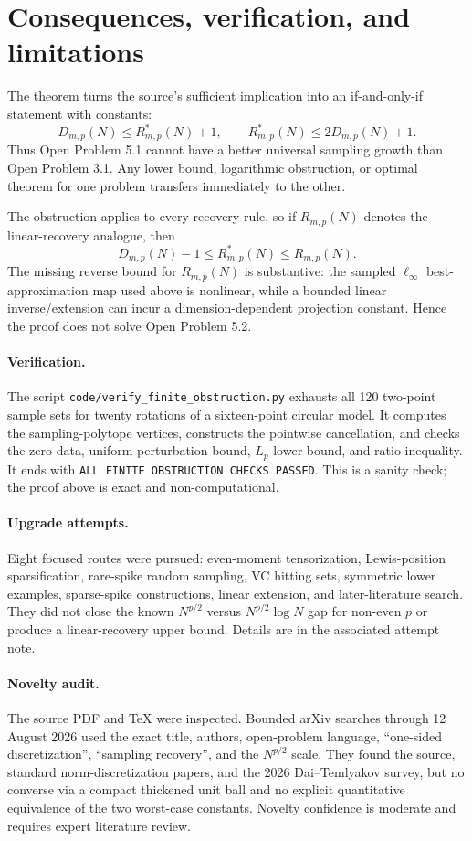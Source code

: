 \documentclass[11pt]{article}
\begin{document}
\section{Consequences, verification, and limitations}

The theorem turns the source's sufficient implication into an if-and-only-if
statement with constants:
\[
 D_{m,p}(N)\le R^*_{m,p}(N)+1,
 \qquad R^*_{m,p}(N)\le2D_{m,p}(N)+1.
\]
Thus Open Problem 5.1 cannot have a better universal sampling growth than Open
Problem 3.1.  Any lower bound, logarithmic obstruction, or optimal theorem for
one problem transfers immediately to the other.

The obstruction applies to every recovery rule, so if $R_{m,p}(N)$ denotes
the linear-recovery analogue, then
\[
 D_{m,p}(N)-1\le R^*_{m,p}(N)\le R_{m,p}(N).
\]
The missing reverse bound for $R_{m,p}(N)$ is substantive: the sampled
$\ell_\infty$ best-approximation map used above is nonlinear, while a bounded
linear inverse/extension can incur a dimension-dependent projection constant.
Hence the proof does not solve Open Problem 5.2.

\paragraph{Verification.}
The script \texttt{code/verify\_finite\_obstruction.py} exhausts all 120
two-point sample sets for twenty rotations of a sixteen-point circular model.
It computes the sampling-polytope vertices, constructs the pointwise
cancellation, and checks the zero data, uniform perturbation bound, $L_p$
lower bound, and ratio inequality.  It ends with
\texttt{ALL FINITE OBSTRUCTION CHECKS PASSED}.  This is a sanity check; the
proof above is exact and non-computational.

\paragraph{Upgrade attempts.}
Eight focused routes were pursued: even-moment tensorization, Lewis-position
sparsification, rare-spike random sampling, VC hitting sets, symmetric lower
examples, sparse-spike constructions, linear extension, and later-literature
search.  They did not close the known $N^{p/2}$ versus
$N^{p/2}\log N$ gap for non-even $p$ or produce a linear-recovery upper bound.
Details are in the associated attempt note.

\paragraph{Novelty audit.}
The source PDF and TeX were inspected.  Bounded arXiv searches through
12 August 2026 used the exact title, authors, open-problem language,
``one-sided discretization'', ``sampling recovery'', and the $N^{p/2}$ scale.
They found the source, standard norm-discretization papers, and the 2026
Dai--Temlyakov survey, but no converse via a compact thickened unit ball and no
explicit quantitative equivalence of the two worst-case constants.  Novelty
confidence is moderate and requires expert literature review.
\end{document}
